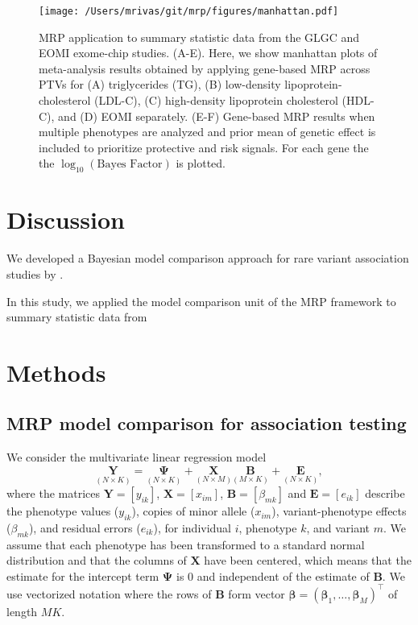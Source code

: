 \documentclass{nature}
\def\bs{\boldsymbol}
\begin{document}
\begin{figure}
\centering
\texttt{[image: /Users/mrivas/git/mrp/figures/manhattan.pdf]}
  \caption{MRP application to summary statistic data from the GLGC and EOMI exome-chip studies. (A-E). Here, we show manhattan plots of meta-analysis results obtained by applying gene-based MRP across PTVs for (A) triglycerides (TG), (B) low-density lipoprotein-cholesterol (LDL-C), (C) high-density lipoprotein cholesterol (HDL-C), and (D) EOMI separately. (E-F) Gene-based MRP results when multiple phenotypes are analyzed and prior mean of genetic effect is included to prioritize protective and risk signals. For each gene the the $\log_{10}\left(\textrm{Bayes Factor}\right)$ is plotted.}
  \label{Fig3}
\end{figure}



\section{Discussion}
We developed a Bayesian model comparison approach for rare variant association studies by . 

In this study, we applied the model comparison unit of the MRP framework to summary statistic data from 

\newpage
\section{Methods}
 
\subsection{MRP model comparison for association testing}
We consider the multivariate linear regression model 
$$\underset{\left(N\times K\right)}{\mathbf{\textrm{Y}}} 
= \underset{\left(N\times K\right)}{\mathbf{\Psi}}  + \underset{\left(N\times M\right)}{\mathbf{\textrm{X}}}\underset{\left(M \times K\right)}{\mathbf{\textrm{B}}} 
+ \underset{\left(N\times K\right)}{\mathbf{\textrm{E}}},$$
where the matrices $\mathbf{\textrm{Y}} = \left[{y}_{i k}\right]$, $\mathbf{\textrm{X}} = \left[ x_{i m}\right]$, 
$\mathbf{\textrm{B}} = \left[ \beta_{m k} \right]$ and $\mathbf{\textrm{E}} = \left[e_{i k}\right]$  describe the phenotype values ($y_{i k}$),
copies of minor allele ($x_{i m}$), variant-phenotype effects ($\beta_{m k}$), and residual errors ($e_{i k}$), 
for individual $i$, phenotype $k$, and variant $m$. 
We assume that each phenotype has been transformed to a standard normal
distribution and that the columns of ${\mathbf{{\textrm{X}}}}$ 
have been centered, which means that the estimate for the intercept term ${\mathbf{\Psi}}$ is 0 and independent of the estimate of ${\mathbf{\textrm{B}}}$.
We use vectorized notation where the rows of ${\mathbf{\textrm{B}}}$ form vector 
$\bs {{ \beta}} = \left(\bs {{ \beta}}_{1},\dots,\bs {{\beta}}_{M}\right)^{\intercal}$
of length $MK$.
\end{document}
